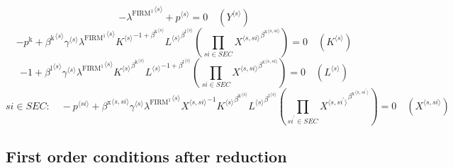 \begin{equation}
-{\lambda^{\mathrm{FIRM}^{\mathrm{1}}}}^{\langle s\rangle} + {p}^{\langle s\rangle} = 0
 \quad \left({Y}^{\langle s\rangle}\right)
\end{equation}
\begin{equation}
-p^{\mathrm{k}} + {{\beta^{\mathrm{k}}}^{\langle s\rangle}} {{\gamma}^{\langle s\rangle}} {{\lambda^{\mathrm{FIRM}^{\mathrm{1}}}}^{\langle s\rangle}} {{{K}^{\langle s\rangle}}^{-1 + {\beta^{\mathrm{k}}}^{\langle s\rangle}}} {{{L}^{\langle s\rangle}}^{{\beta^{\mathrm{l}}}^{\langle s\rangle}}} \left(\prod_{{s\!i}\in {S\!E\!C}} {{X}^{\langle s,{s\!i}\rangle}}^{{\beta^{\mathrm{x}}}^{\langle s,{s\!i}\rangle}}\right) = 0
 \quad \left({K}^{\langle s\rangle}\right)
\end{equation}
\begin{equation}
-1 + {{\beta^{\mathrm{l}}}^{\langle s\rangle}} {{\gamma}^{\langle s\rangle}} {{\lambda^{\mathrm{FIRM}^{\mathrm{1}}}}^{\langle s\rangle}} {{{K}^{\langle s\rangle}}^{{\beta^{\mathrm{k}}}^{\langle s\rangle}}} {{{L}^{\langle s\rangle}}^{-1 + {\beta^{\mathrm{l}}}^{\langle s\rangle}}} \left(\prod_{{s\!i}\in {S\!E\!C}} {{X}^{\langle s,{s\!i}\rangle}}^{{\beta^{\mathrm{x}}}^{\langle s,{s\!i}\rangle}}\right) = 0
 \quad \left({L}^{\langle s\rangle}\right)
\end{equation}
\begin{equation}
{s\!i}\in {S\!E\!C}\colon\quad -{p}^{\langle {s\!i}\rangle} + {{\beta^{\mathrm{x}}}^{\langle s,{s\!i}\rangle}} {{\gamma}^{\langle s\rangle}} {{\lambda^{\mathrm{FIRM}^{\mathrm{1}}}}^{\langle s\rangle}} {{X}^{\langle s,{s\!i}\rangle}}^{-1} {{{K}^{\langle s\rangle}}^{{\beta^{\mathrm{k}}}^{\langle s\rangle}}} {{{L}^{\langle s\rangle}}^{{\beta^{\mathrm{l}}}^{\langle s\rangle}}} \left(\prod_{{s\!i}^{\prime}\in {S\!E\!C}} {{X}^{\langle s,{s\!i}^{\prime}\rangle}}^{{\beta^{\mathrm{x}}}^{\langle s,{s\!i}^{\prime}\rangle}}\right) = 0
 \quad \left({X}^{\langle s,{s\!i}\rangle}\right)
\end{equation}


\subsection{First order conditions after reduction}

